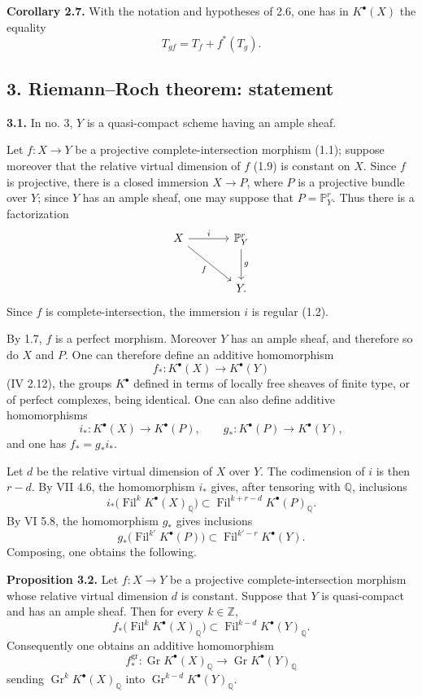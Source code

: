 \documentclass[11pt]{article}
\newcommand{\Gr}{\operatorname{Gr}}
\newcommand{\Fil}{\operatorname{Fil}}
\providecommand{\Gr}{\operatorname{Gr}}
\providecommand{\Gr}{\operatorname{G}}
\begin{document}
\textbf{Corollary 2.7.} With the notation and hypotheses of 2.6, one has in $K^{\bullet}(X)$ the equality
\[
T_{gf}=T_f+f^*(T_g).
\]

\subsection*{3. Riemann--Roch theorem: statement}

\textbf{3.1.} In no. 3, $Y$ is a quasi-compact scheme having an ample sheaf.

Let $f:X\to Y$ be a projective complete-intersection morphism (1.1); suppose moreover that the relative virtual dimension of $f$ (1.9) is constant on $X$. Since $f$ is projective, there is a closed immersion $X\to P$, where $P$ is a projective bundle over $Y$; since $Y$ has an ample sheaf, one may suppose that $P=\mathbb P^r_Y$. Thus there is a factorization
\[
\begin{tikzcd}[column sep=large,row sep=large]
X \arrow[r,"i"] \arrow[dr,"f"'] & \mathbb P^r_Y \arrow[d,"g"]\\
& Y.
\end{tikzcd}
\]
Since $f$ is complete-intersection, the immersion $i$ is regular (1.2).

By 1.7, $f$ is a perfect morphism. Moreover $Y$ has an ample sheaf, and therefore so do $X$ and $P$. One can therefore define an additive homomorphism
\[
f_*:K^{\bullet}(X)\longrightarrow K^{\bullet}(Y)
\]
(IV 2.12), the groups $K^{\bullet}$ defined in terms of locally free sheaves of finite type, or of perfect complexes, being identical. One can also define additive homomorphisms
\[
i_*:K^{\bullet}(X)\longrightarrow K^{\bullet}(P),
\qquad
 g_*:K^{\bullet}(P)\longrightarrow K^{\bullet}(Y),
\]
and one has $f_*=g_*i_*$.

Let $d$ be the relative virtual dimension of $X$ over $Y$. The codimension of $i$ is then $r-d$. By VII 4.6, the homomorphism $i_*$ gives, after tensoring with $\mathbb Q$, inclusions
\[
i_*\bigl(\Fil^kK^{\bullet}(X)_{\mathbb Q}\bigr)
\subset
\Fil^{k+r-d}K^{\bullet}(P)_{\mathbb Q}.
\]
By VI 5.8, the homomorphism $g_*$ gives inclusions
\[
g_*\bigl(\Fil^{k'}K^{\bullet}(P)\bigr)
\subset
\Fil^{k'-r}K^{\bullet}(Y).
\]
Composing, one obtains the following.

\textbf{Proposition 3.2.} Let $f:X\to Y$ be a projective complete-intersection morphism whose relative virtual dimension $d$ is constant. Suppose that $Y$ is quasi-compact and has an ample sheaf. Then for every $k\in\mathbb Z$,
\[
f_*\bigl(\Fil^kK^{\bullet}(X)_{\mathbb Q}\bigr)
\subset
\Fil^{k-d}K^{\bullet}(Y)_{\mathbb Q}.
\]
Consequently one obtains an additive homomorphism
\[
f^{\mathrm{gr}}_*:\Gr K^{\bullet}(X)_{\mathbb Q}\longrightarrow
\Gr K^{\bullet}(Y)_{\mathbb Q}
\]
sending $\Gr^kK^{\bullet}(X)_{\mathbb Q}$ into $\Gr^{k-d}K^{\bullet}(Y)_{\mathbb Q}$.
\end{document}
